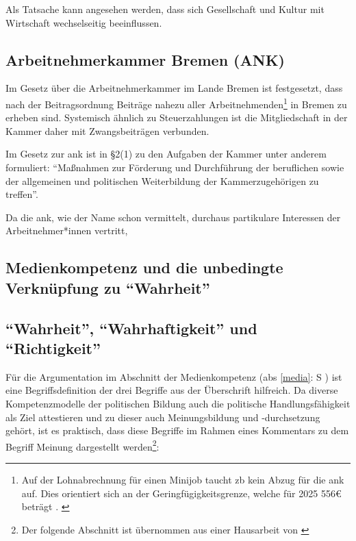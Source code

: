 

Als Tatsache kann angesehen werden, dass sich Gesellschaft und Kultur mit Wirtschaft wechselseitig beeinflussen. 


\subsection{Arbeitnehmerkammer Bremen (ANK) \label{ank}}
Im Gesetz über die Arbeitnehmerkammer im Lande Bremen \autocite[]{ArbnkG} ist festgesetzt, dass nach der Beitragsordnung \autocite[]{ArbnkB} Beiträge nahezu aller Arbeitnehmenden\footnote{ 
    Auf der Lohnabrechnung für einen Minijob taucht \gls{zb} kein Abzug für die \gls{ank} auf. Dies orientiert sich an der Geringfügigkeitsgrenze, welche für 2025 556€ beträgt \autocites{b.gering}{banz.gering}. \label{Geringfügigkeitsgrenze}} 
in Bremen zu erheben sind. Systemisch ähnlich zu Steuerzahlungen ist die Mitgliedschaft in der Kammer daher mit Zwangsbeiträgen verbunden. 

Im Gesetz zur \gls{ank} ist in \S2(1) \autocite[1]{ArbnkG} zu den Aufgaben der Kammer unter anderem formuliert: \enquote{Maßnahmen zur Förderung und Durchführung der beruflichen sowie der allgemeinen und politischen Weiterbildung der Kammerzugehörigen zu treffen}.


Da die \gls{ank}, wie der Name schon vermittelt, durchaus partikulare Interessen der Arbeitnehmer*innen vertritt, 



\subsection{Medienkompetenz und die unbedingte Verknüpfung zu \enquote{Wahrheit} \label{media}} 

\subsection{\enquote{Wahrheit}, \enquote{Wahrhaftigkeit} und \enquote{Richtigkeit} \label{wahr}}

Für die Argumentation im Abschnitt der Medienkompetenz (\gls{abs} \ref{media}: \gls{S} \pageref{media}) ist eine Begriffsdefinition der drei Begriffe aus der Überschrift hilfreich. Da diverse Kompetenzmodelle der politischen Bildung auch die politische Handlungsfähigkeit als Ziel attestieren und zu dieser auch Meinungsbildung und -durchsetzung gehört, ist es praktisch, dass diese Begriffe im Rahmen eines Kommentars zu dem Begriff Meinung dargestellt werden\footnote{Der folgende Abschnitt ist übernommen aus einer Hausarbeit von \textcite[4]{Klein2022}}:

